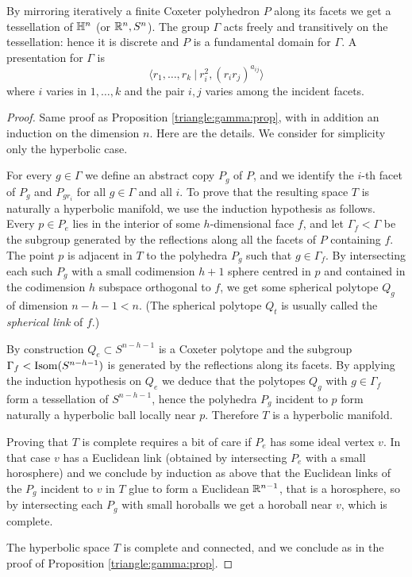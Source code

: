 \begin{teo}
By mirroring iteratively a finite Coxeter polyhedron $P$ along its facets we get a tessellation of $\mathbb{H}^n$ (or $\mathbb{R}^n, S^n$).
The group $\Gamma$ acts freely and transitively on the tessellation: hence it is discrete and $P$ is a fundamental domain for $\Gamma$. A presentation for $\Gamma$ is
$$\langle r_1, \ldots, r_k \ |\  r_i^2, (r_ir_j)^{a_{ij}} \rangle$$
where $i$ varies in $1,\ldots, k$ and the pair $i,j$ varies among the incident facets.
\end{teo}
\begin{proof}
Same proof as Proposition \ref{triangle:gamma:prop}, with in addition an induction on the dimension $n$. Here are the details. We consider for simplicity only the hyperbolic case.

For every $g\in \Gamma$ we define an abstract copy $P_g$ of $P$, and we identify the $i$-th facet of $P_g$ and $P_{gr_i}$ for all $g\in \Gamma$ and all $i$. To prove that the resulting space $T$ is naturally a hyperbolic manifold, we use the induction hypothesis as follows. Every $p\in P_e$ lies in the interior of some $h$-dimensional face $f$, and let $\Gamma_f<\Gamma$ be the subgroup generated by the reflections along all the facets of $P$ containing $f$. The point $p$ is adjacent in $T$ to the polyhedra $P_g$ such that $g\in \Gamma_f$. By intersecting each such $P_g$ with a small codimension $h+1$ sphere centred in $p$ and contained in the codimension $h$ subspace orthogonal to $f$, we get some spherical polytope $Q_g$ of dimension $n-h-1<n$. (The spherical polytope $Q_t$ is usually called the \emph{spherical link} of $f$.)

By construction $Q_e \subset S^{n-h-1}$ is a Coxeter polytope and the subgroup $\Gamma_f < {\rm Isom}(S^{n-h-1})$ is generated by the reflections along its facets. By applying the induction hypothesis on $Q_e$ we deduce that the polytopes $Q_g$ with $g\in \Gamma_f$ form a tessellation of $S^{n-h-1}$, hence the polyhedra $P_g$ incident to $p$ form naturally a hyperbolic ball locally near $p$. Therefore $T$ is a hyperbolic manifold.

Proving that $T$ is complete requires a bit of care if $P_e$ has some ideal vertex $v$. In that case $v$ has a Euclidean link (obtained by intersecting $P_e$ with a small horosphere) and we conclude by induction as above that the Euclidean links of the $P_g$ incident to $v$ in $T$ glue to form a Euclidean $\mathbb{R}^{n-1}$, that is a horosphere, so by intersecting each $P_g$ with small horoballs we get a horoball near $v$, which is complete.

The hyperbolic space $T$ is complete and connected, and we conclude as in the proof of Proposition \ref{triangle:gamma:prop}. 
\end{proof}

